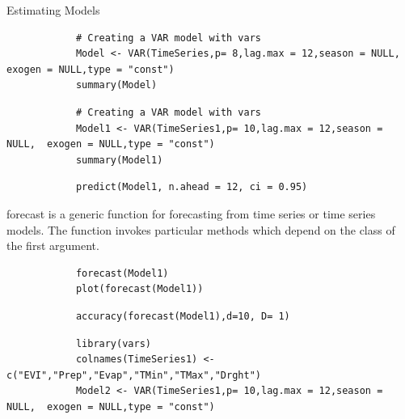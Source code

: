 \documentclass[12pt,a4paper]{book}
\begin{document}
			 Estimating Models
			 
				\begin{verbatim}
			# Creating a VAR model with vars
			Model <- VAR(TimeSeries,p= 8,lag.max = 12,season = NULL,  exogen = NULL,type = "const")
			summary(Model)
				\end{verbatim}
	
				\begin{verbatim}
			# Creating a VAR model with vars
			Model1 <- VAR(TimeSeries1,p= 10,lag.max = 12,season = NULL,  exogen = NULL,type = "const")
			summary(Model1)
				\end{verbatim}
	
				\begin{verbatim}
			predict(Model1, n.ahead = 12, ci = 0.95)
				\end{verbatim}
			forecast is a generic function for forecasting from time series or time series models. The function invokes particular methods which depend on the class of the first argument.
				\begin{verbatim}
			forecast(Model1)
			plot(forecast(Model1))
				\end{verbatim}
	
				\begin{verbatim}
			accuracy(forecast(Model1),d=10, D= 1)
				\end{verbatim}
	
				\begin{verbatim}
			library(vars)
			colnames(TimeSeries1) <-c("EVI","Prep","Evap","TMin","TMax","Drght")
			Model2 <- VAR(TimeSeries1,p= 10,lag.max = 12,season = NULL,  exogen = NULL,type = "const")
				\end{verbatim}
		
\end{document}

